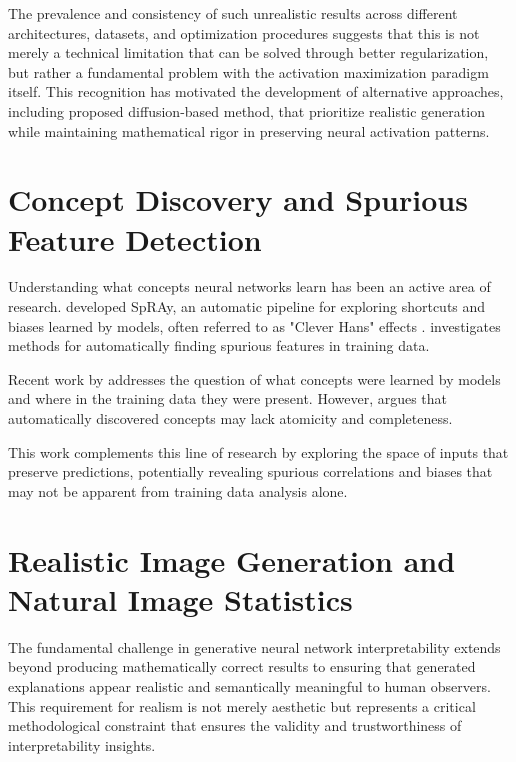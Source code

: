 \documentclass[licencjacka,en]{pracamgr}
\begin{document}
The prevalence and consistency of such unrealistic results across different architectures, datasets, and optimization procedures suggests that this is not merely a technical limitation that can be solved through better regularization, but rather a fundamental problem with the activation maximization paradigm itself. This recognition has motivated the development of alternative approaches, including proposed diffusion-based method, that prioritize realistic generation while maintaining mathematical rigor in preserving neural activation patterns.

\section{Concept Discovery and Spurious Feature Detection}

Understanding what concepts neural networks learn has been an active area of research. \citep{Lapuschkin_2019} developed SpRAy, an automatic pipeline for exploring shortcuts and biases learned by models, often referred to as "Clever Hans" effects \citep{pfungst1911cleverHans}. \citep{neuhaus2023spuriousfeatureslargescale} investigates methods for automatically finding spurious features in training data.

Recent work by \citep{dreyer2025mechanisticunderstandingvalidationlarge} addresses the question of what concepts were learned by models and where in the training data they were present. However, \citep{leask2025sparse} argues that automatically discovered concepts may lack atomicity and completeness.

This work complements this line of research by exploring the space of inputs that preserve predictions, potentially revealing spurious correlations and biases that may not be apparent from training data analysis alone.

\section{Realistic Image Generation and Natural Image Statistics}

The fundamental challenge in generative neural network interpretability extends beyond producing mathematically correct results to ensuring that generated explanations appear realistic and semantically meaningful to human observers. This requirement for realism is not merely aesthetic but represents a critical methodological constraint that ensures the validity and trustworthiness of interpretability insights.
\end{document}
